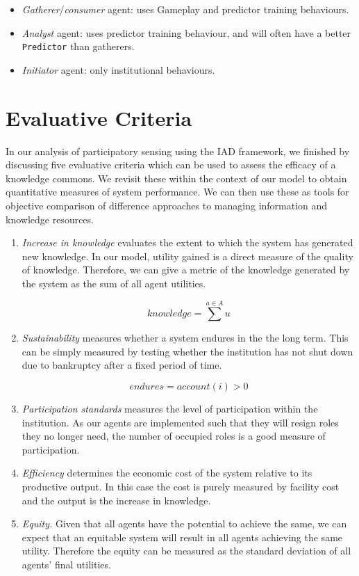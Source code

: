 \begin{itemize}
\item \emph{Gatherer}/\emph{consumer} agent: uses Gameplay and predictor training behaviours.
\item \emph{Analyst} agent: uses predictor training behaviour, and will often have a better \texttt{Predictor} than gatherers.
\item \emph{Initiator} agent: only institutional behaviours.
\end{itemize}

\section{Evaluative Criteria}

In our analysis of participatory sensing using the \ac{IAD} framework, we finished by
discussing five evaluative criteria which can be used to assess the efficacy
of a knowledge commons. We revisit these within the context of our model to
obtain quantitative measures of system performance. We can then use these as
tools for objective comparison of difference approaches to managing
information and knowledge resources.

\begin{enumerate}
\item \emph{Increase in knowledge} evaluates the extent to which the system has
generated new knowledge. In our model, utility gained is a direct measure of the
quality of knowledge. Therefore, we can give a metric of the knowledge generated
by the system as the sum of all agent utilities.

\begin{equation}
\mathit{knowledge} = \sum^{a\in A} u
\end{equation}

\item \emph{Sustainability} measures whether a system endures in the the long term.
This can be simply measured by testing whether the institution has not shut down 
due to bankruptcy after a fixed period of time.

\begin{equation}
\mathit{endures} = \mathit{account}(i) > 0
\end{equation}

\item \emph{Participation standards} measures the level of participation within the 
institution. As our agents are implemented such that they will resign roles they 
no longer need, the number of occupied roles is a good measure of participation.

\item \emph{Efficiency} determines the economic cost of the system relative to its productive output. In this case the cost is purely measured by facility cost and the output is the increase in knowledge.

\item \emph{Equity.} Given that all agents have the potential to achieve the same, we can expect that an equitable system will result in all agents achieving the same utility. Therefore the equity can be measured as the standard deviation of all agents' final utilities. 
\end{enumerate}

